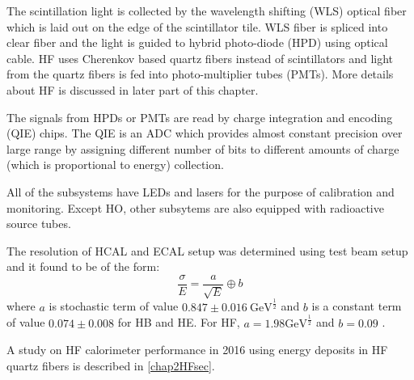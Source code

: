 The scintillation light is collected by the wavelength shifting (WLS) optical fiber which is laid out on the edge of the scintillator 
tile. WLS fiber is spliced into clear fiber and the light is guided to hybrid photo-diode (HPD) using optical cable. HF uses Cherenkov 
based quartz fibers instead of scintillators and light from the quartz fibers is fed into photo-multiplier tubes (PMTs). More details 
about HF is discussed in later part of this chapter.

The signals from HPDs or PMTs are read by charge integration and encoding (QIE) chips. The QIE is an ADC which provides almost constant 
precision over large range by assigning different number of bits to different amounts of charge (which is proportional to energy) 
collection.

All of the subsystems have LEDs and lasers for the purpose of calibration and monitoring. Except HO, other subsytems are also equipped 
with radioactive source tubes.

The resolution of HCAL and ECAL setup was determined using test beam setup and it found to be of the form:
\begin{equation}
\frac{\sigma}{E} = \frac{a}{\sqrt{E}} \oplus b
\end{equation}
where $a$ is stochastic term of value $0.847\pm 0.016\ {\mathrm{GeV}}^{\frac{1}{2}}$ and $b$ is a constant term of value $0.074\pm0.008$ 
for HB and HE. For HF, $a = 1.98 {\mathrm{GeV}}^{\frac{1}{2}}$ and $b = 0.09$ \cite{Collaboration_2010}.

A study on HF calorimeter performance in 2016 using energy deposits in HF quartz fibers is described in \ref{chap2HFsec}.

